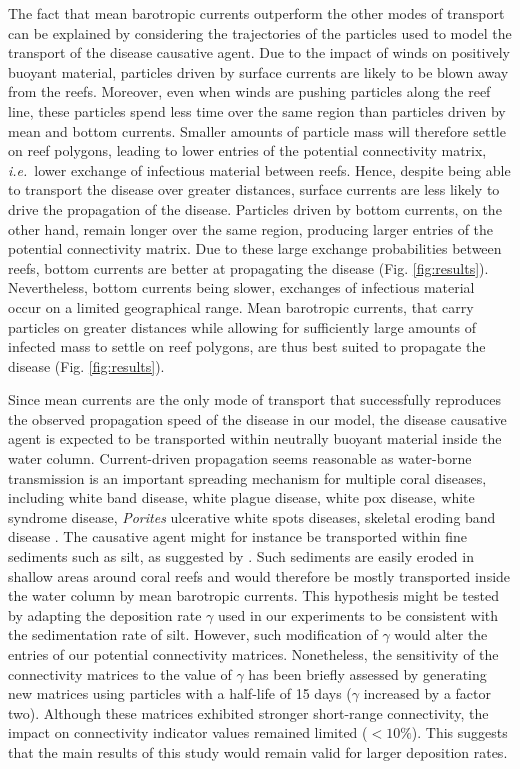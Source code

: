 \documentclass[utf8]{frontiersSCNS}
\newcommand{\ie}{{\it i.e.}\ }
\begin{document}
The fact that mean barotropic currents outperform the other modes of transport can be explained by considering the trajectories of the particles used to model the transport of the disease causative agent. Due to the impact of winds on positively buoyant material, particles driven by surface currents are likely to be blown away from the reefs. Moreover, even when winds are pushing particles along the reef line, these particles spend less time over the same region than particles driven by mean and bottom currents. Smaller amounts of particle mass will therefore settle on reef polygons, leading to lower entries of the potential connectivity matrix, \ie lower exchange of infectious material between reefs. Hence, despite being able to transport the disease over greater distances, surface currents are less likely to drive the propagation of the disease. Particles driven by bottom currents, on the other hand, remain longer over the same region, producing larger entries of the potential connectivity matrix. Due to these large exchange probabilities between reefs, bottom currents are better at propagating the disease (Fig. \ref{fig:results}). Nevertheless, bottom currents being slower, exchanges of infectious material occur on a limited geographical range. Mean barotropic currents, that carry particles on greater distances while allowing for sufficiently large amounts of infected mass to settle on reef polygons, are thus best suited to propagate the disease (Fig. \ref{fig:results}).

Since mean currents are the only mode of transport that successfully reproduces the observed propagation speed of the disease in our model, the disease causative agent is expected to be transported within neutrally buoyant material inside the water column. Current-driven propagation seems reasonable as water-borne transmission is an important spreading mechanism for multiple coral diseases, including white band disease, white plague disease, white pox disease, white syndrome disease, \textit{Porites} ulcerative white spots diseases, skeletal eroding band disease \citep{shore2019modes}. The causative agent might for instance be transported within fine sediments such as silt, as suggested by \cite{rosales2020rhodobacterales}. Such sediments are easily eroded in shallow areas around coral reefs and would therefore be mostly transported inside the water column by mean barotropic currents. This hypothesis might be tested by adapting the deposition rate $\gamma$ used in our experiments to be consistent with the sedimentation rate of silt. However, such modification of $\gamma$ would alter the entries of our potential connectivity matrices. Nonetheless, the sensitivity of the connectivity matrices to the value of $\gamma$ has been briefly assessed by generating new matrices using particles with a half-life of 15 days ($\gamma$ increased by a factor two). Although these matrices exhibited stronger short-range connectivity, the impact on connectivity indicator values remained  limited ($<10\%$). This suggests that the main results of this study would remain valid for larger deposition rates.  
\end{document}
